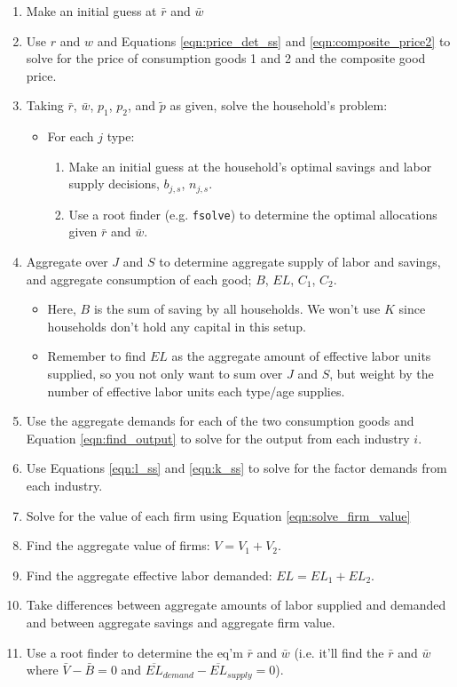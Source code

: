 \documentclass[letterpaper,12pt]{article}
\theoremstyle{definition}
\begin{document}
\begin{spacing}{1.5}
\begin{enumerate}
\item Make an initial guess at $\bar{r}$ and $\bar{w}$
\item Use $r$ and $w$ and Equations \ref{eqn:price_det_ss} and \ref{eqn:composite_price2} to solve for the price of consumption goods 1 and 2 and the composite good price.
\item Taking $\bar{r}$, $\bar{w}$, $p_{1}$, $p_{2}$, and $\tilde{p}$ as given, solve the household's problem:
	\begin{itemize}
	\item For each $j$ type:
		\begin{enumerate}
		\item Make an initial guess at the household's optimal savings and labor supply decisions, $b_{j,s}$, $n_{j,s}$.
		\item Use a root finder (e.g. \texttt{fsolve}) to determine the optimal allocations given $\bar{r}$ and $\bar{w}$.
		\end{enumerate}
	\end{itemize}
\item Aggregate over $J$ and $S$ to determine aggregate supply of labor and savings, and aggregate consumption of each good; $B$, $EL$, $C_{1}$, $C_{2}$.
	\begin{itemize}
	\item Here, $B$ is the sum of saving by all households.  We won't use $K$ since households don't hold any capital in this setup.
	\item Remember to find $EL$ as the aggregate amount of effective labor units supplied, so you not only want to sum over $J$ and $S$, but weight by the number of effective labor units each type/age supplies.
	\end{itemize}
\item Use the aggregate demands for each of the two consumption goods and Equation \ref{eqn:find_output} to solve for the output from each industry $i$.
\item Use Equations \ref{eqn:l_ss} and \ref{eqn:k_ss} to solve for the factor demands from each industry.
\item Solve for the value of each firm using Equation \ref{eqn:solve_firm_value}
\item Find the aggregate value of firms: $V = V_{1}+V_{2}$.
\item Find the aggregate effective labor demanded: $EL = EL_{1}+EL_{2}$.
\item Take differences between aggregate amounts of labor supplied and demanded and between aggregate savings and aggregate firm value.
\item Use a root finder to determine the eq'm $\bar{r}$ and $\bar{w}$ (i.e. it'll find the $\bar{r}$ and $\bar{w}$ where $\bar{V}-\bar{B}=0$ and $\overline{EL}_{demand}-\overline{EL}_{supply}=0$).
\end{enumerate}


\end{spacing}
\end{document}
